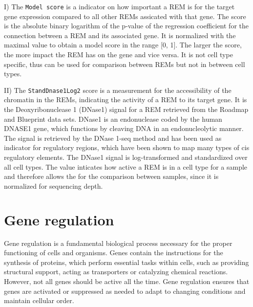 \documentclass[pdftex,12pt,a4paper]{report}
\begin{document}
I) The \texttt{Model score} is a indicator on how important a REM is for the target gene expression compared to all other REMs assicated with that gene. The score is the absolute binary logarithm of the p-value of the regression coefficient for the connection between a REM and its associated gene. It is normalized with the maximal value to obtain a model score in the range [0, 1]. The larger the score, the more impact the REM has on the gene and vice versa. It is not cell type specific, thus can be used for comparison between REMs but not in between cell types.

II) The \texttt{StandDnase1Log2} score is a measurement for the accessibility of the chromatin in the REMs, indicating the activity of a REM to its target gene. It is the Deoxyribonuclease 1 (DNase1) signal for a REM retrieved from the Roadmap\cite{roadmap} and Blueprint\cite{blueprint} data sets. DNase1 is an endonuclease coded by the human DNASE1 gene, which functions by cleaving DNA in an endonucleolytic manner\cite{dnase_nih}. The signal is retrieved by the DNase 1-seq method\cite{dnase_method} and has been used as indicator for regulatory regions, which have been shown to map many types of cis regulatory elements. The DNase1 signal is log-transformed and standardized over all cell types\cite{dnase_cis}. The value inticates how active a REM is in a cell type for a sample and therefore allows the for the comparison between samples, since it is normalized for sequencing depth. 
\section{Gene regulation}
Gene regulation is a fundamental biological process necessary for the proper functioning of cells and organisms. Genes contain the instructions for the synthesis of proteins, which perform essential tasks within cells, such as providing structural support, acting as transporters or catalyzing chemical reactions. However, not all genes should be active all the time. Gene regulation ensures that genes are activated or suppressed as needed to adapt to changing conditions and maintain cellular order.
\end{document}
